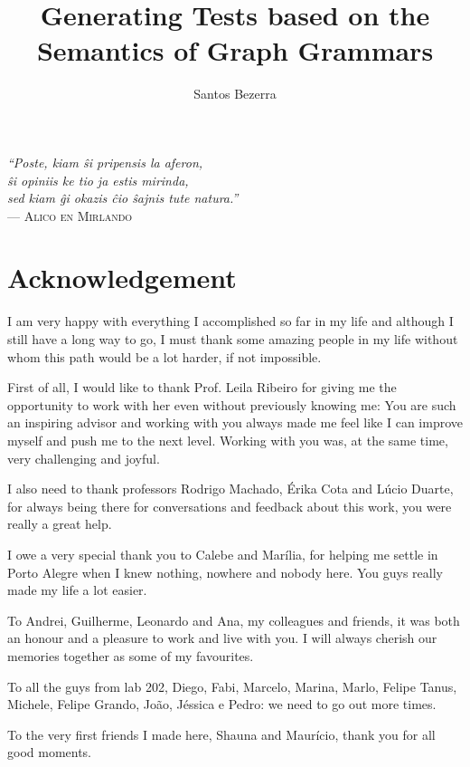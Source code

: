 \documentclass[ppgc,diss,english,openright]{iiufrgs}
\title{Generating Tests based on the Semantics of Graph Grammars}
\author{Santos Bezerra}{Jonas}
\theoremstyle{plain}
\theoremstyle{definition}
\begin{document}
\maketitle
\clearpage

\clearpage
\begin{flushright}
  \mbox{}\vfill
  {\sffamily\itshape
  ``Poste, kiam \^si pripensis la aferon,\\
  \^si opiniis ke tio ja estis mirinda,\\
  sed kiam \^gi okazis \^cio \^sajnis tute natura.''\\}
  --- \textsc{Alico en Mirlando}
\end{flushright}

\chapter*{Acknowledgement}
  I am very happy with everything I accomplished so far in my life and although I still have a long way to go, I must thank some amazing people in my life without whom this path would be a lot harder, if not impossible.

  First of all, I would like to thank Prof. Leila Ribeiro for giving me the opportunity to work with her even without previously knowing me: You are such an inspiring advisor and working with you always made me feel like I can improve myself and push me to the next level. Working with you was, at the same time, very challenging and joyful.

  I also need to thank professors Rodrigo Machado, Érika Cota and Lúcio Duarte, for always being there for conversations and feedback about this work, you were really a great help.

  I owe a very special thank you to Calebe and Marília, for helping me settle in Porto Alegre when I knew nothing, nowhere and nobody here. You guys really made my life a lot easier.

  To Andrei, Guilherme, Leonardo and Ana, my colleagues and friends, it was both an honour and a pleasure to work and live with you. I will always cherish our memories together as some of my favourites.

  To all the guys from lab 202, Diego, Fabi, Marcelo, Marina, Marlo, Felipe Tanus, Michele, Felipe Grando, João, Jéssica e Pedro: we need to go out more times.

  To the very first friends I made here, Shauna and Maurício, thank you for all good moments. 
\end{document}
